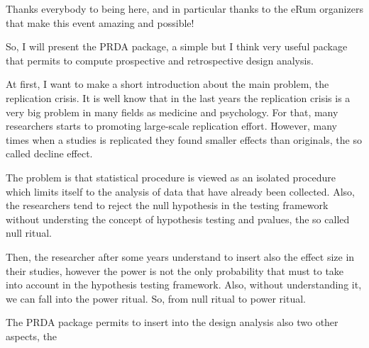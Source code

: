 \documentclass{article}
\numberwithin{equation}{section}
\newcounter{problem}
\begin{document}
Thanks everybody to being here, and in particular thanks to the eRum organizers that make this event amazing and possible!

So, I will present the PRDA package, a simple but I think very useful package that permits to compute prospective and retrospective design analysis.

At first, I want to make a short introduction about the main problem, the replication crisis. It is well know that in the last years the replication crisis is a very big problem in many fields as medicine and psychology. For that, many researchers starts to promoting large-scale replication effort. However, many times when a studies is replicated they found smaller effects than originals, the so called decline effect.

The problem is that statistical procedure is viewed as an isolated procedure which limits itself to the analysis of data that have already been collected. Also, the researchers tend to reject the null hypothesis in the testing framework without understing the concept of hypothesis testing and pvalues, the so called null ritual. 

Then, the researcher after some years understand to insert also the effect size in their studies, however the power is not the only probability that must to take into account in the hypothesis testing framework. Also, without understanding it, we can fall into the power ritual. So, from null ritual to power ritual.

The PRDA package permits to insert into the design analysis also two other aspects, the 
\end{document}
